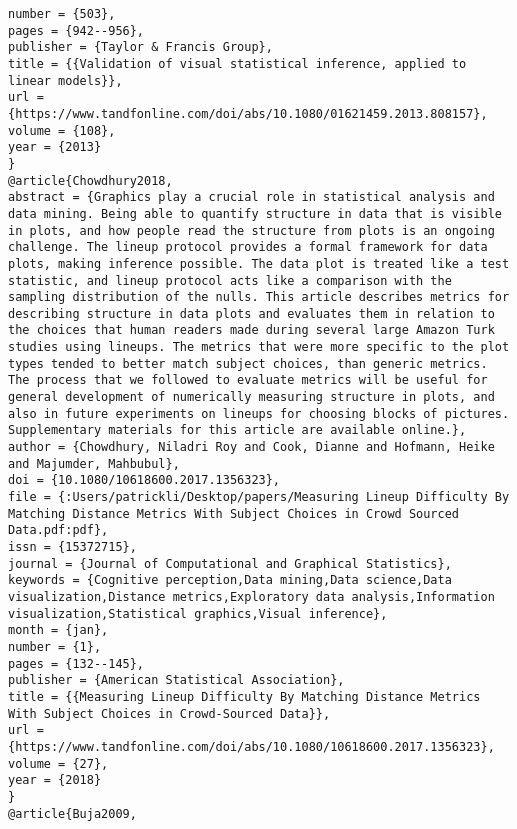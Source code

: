 \documentclass[
]{book}
\begin{document}
\begin{verbatim}
number = {503},
pages = {942--956},
publisher = {Taylor & Francis Group},
title = {{Validation of visual statistical inference, applied to linear models}},
url = {https://www.tandfonline.com/doi/abs/10.1080/01621459.2013.808157},
volume = {108},
year = {2013}
}
@article{Chowdhury2018,
abstract = {Graphics play a crucial role in statistical analysis and data mining. Being able to quantify structure in data that is visible in plots, and how people read the structure from plots is an ongoing challenge. The lineup protocol provides a formal framework for data plots, making inference possible. The data plot is treated like a test statistic, and lineup protocol acts like a comparison with the sampling distribution of the nulls. This article describes metrics for describing structure in data plots and evaluates them in relation to the choices that human readers made during several large Amazon Turk studies using lineups. The metrics that were more specific to the plot types tended to better match subject choices, than generic metrics. The process that we followed to evaluate metrics will be useful for general development of numerically measuring structure in plots, and also in future experiments on lineups for choosing blocks of pictures. Supplementary materials for this article are available online.},
author = {Chowdhury, Niladri Roy and Cook, Dianne and Hofmann, Heike and Majumder, Mahbubul},
doi = {10.1080/10618600.2017.1356323},
file = {:Users/patrickli/Desktop/papers/Measuring Lineup Difficulty By Matching Distance Metrics With Subject Choices in Crowd Sourced Data.pdf:pdf},
issn = {15372715},
journal = {Journal of Computational and Graphical Statistics},
keywords = {Cognitive perception,Data mining,Data science,Data visualization,Distance metrics,Exploratory data analysis,Information visualization,Statistical graphics,Visual inference},
month = {jan},
number = {1},
pages = {132--145},
publisher = {American Statistical Association},
title = {{Measuring Lineup Difficulty By Matching Distance Metrics With Subject Choices in Crowd-Sourced Data}},
url = {https://www.tandfonline.com/doi/abs/10.1080/10618600.2017.1356323},
volume = {27},
year = {2018}
}
@article{Buja2009,

\end{verbatim}
\end{document}
